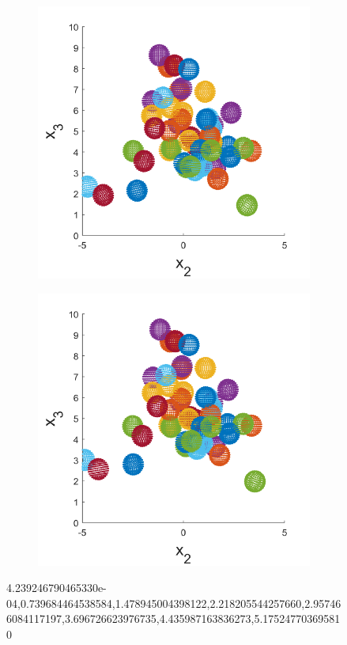 \begin{figure}
\begin{subfigure}[b]{0.24\textwidth}
    \caption[]{\label{fig:squirmerPosF}}
\end{subfigure}
\begin{subfigure}[b]{0.24\textwidth}
    \centering
    \includegraphics[width=\textwidth]{Images/squirmers/Gyro-7-All.pdf}
    \caption[]{\label{fig:squirmerPosG}}
\end{subfigure}
\begin{subfigure}[b]{0.24\textwidth}
    \centering
    \includegraphics[width=\textwidth]{Images/squirmers/Gyro-8-All.pdf}
    \caption[]{\label{fig:squirmerPosH}}
\end{subfigure}
\label{fig:SquiremerGyroPo}
\caption{4.239246790465330e-04,0.739684464538584,1.478945004398122,2.218205544257660,2.957466084117197,3.696726623976735,4.435987163836273,5.175247703695810}
\end{figure}

